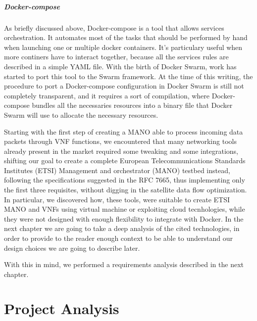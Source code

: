 \documentclass[10pt]{book}
\begin{document}
\paragraph{Docker-compose} As briefly discussed above, Docker-compose is a tool
that allows services orchestration. It automates most of the tasks that should
be performed by hand when launching one or multiple docker containers. It's
particulary useful when more continers have to interact together,
because all the services rules are described in a simple YAML file.
With the birth of Docker Swarm, work has started to port this tool to the Swarm
framework. At the time of this writing, the procedure to port a Docker-compose
configuration in Docker Swarm is still not completely transparent, and it
requires a sort of compilation, where Docker-compose bundles all the
necessaries resources into a binary file that Docker Swarm will use to allocate
the necessary resources.

\vspace{0.5cm}

Starting with the first step of creating a MANO able to process incoming data
packets through VNF functions, we encountered that many networking tools
already present in the market required some tweaking and some integrations,
shifting our goal to create a complete  European Telecommunications Standards
Institutes (ETSI) Management and orchestrator (MANO) testbed instead, following
the specifications suggested in the RFC 7665, thus implementing only the first
three requisites, without digging in the satellite data flow optimization. In 
particular, we discovered how, these tools, were suitable to create ETSI MANO 
and VNFs using virtual machine or exploiting cloud tecnhologies, while they 
were not designed with enough flexibility to integrate with Docker. In the next 
chapter we are going to take a deep analysis of the cited technologies, in 
order to provide to the reader enough context to be able to understand our 
design choices we are going to describe later.


\noindent With this in mind, we performed a requirements analysis described in 
the next chapter.

\chapter{Project Analysis}
\label{chap:prjan}
\end{document}
